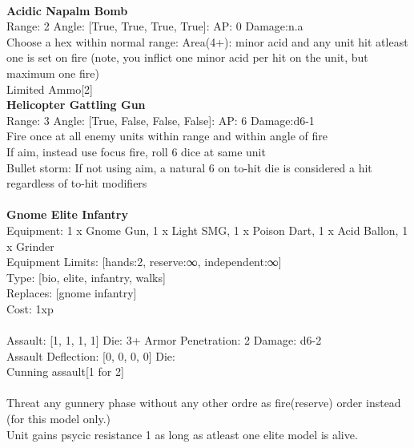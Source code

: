 \ \\
{\bf Acidic Napalm Bomb } \\



Range: 2  Angle: [True, True, True, True]: AP: 0 Damage:n.a \\
Choose a hex within normal range: Area(4+): minor acid and any unit hit atleast one is set on fire (note, you inflict one minor acid per hit on the unit, but maximum one fire)\\ 
Limited Ammo[2]\\ 




{\bf Helicopter Gattling Gun } \\



Range: 3  Angle: [True, False, False, False]: AP: 6 Damage:d6-1 \\
Fire once at all enemy units within range and within angle of fire\\ 
If aim, instead use focus fire, roll 6 dice at same unit\\ 
Bullet storm: If not using aim, a natural 6 on to-hit die is considered a hit regardless of to-hit modifiers\\ 




 
\ \\

{\bf Gnome Elite Infantry } \\
Equipment: 1 x Gnome Gun, 1 x Light SMG, 1 x Poison Dart, 1 x Acid Ballon, 1 x Grinder \\
Equipment Limits: [hands:2, reserve:∞, independent:∞] \\
Type: [bio, elite, infantry, walks] \\
Replaces: [gnome infantry] \\
Cost: 1xp\\
\ \\
Assault: [1, 1, 1, 1] Die: 3+ Armor Penetration: 2 Damage: d6-2 \\
Assault Deflection: [0, 0, 0, 0] Die: \\
\indent Cunning assault[1 for 2]\\ 
 
\ \\
Threat any gunnery phase without any other ordre as fire(reserve) order instead (for this model only.)\\ 
Unit gains psycic resistance 1 as long as atleast one elite model is alive.\\ 

